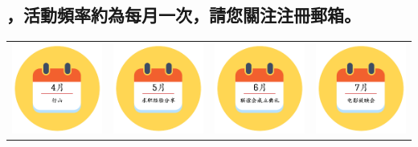 \documentclass[11pt, oneside,margin=1in]{article}   	%
\newcommand{\chuhao}{\fontsize{14bp}{\baselineskip}}
\begin{document}
\begin{CJK}{UTF8}{bkai}
\section*{，活動頻率約為每月一次，請您關注注冊郵箱。}
\center
\begin{tabular}{ l c r r }
 \includegraphics[width=1.2in]{res/4.png} &  \includegraphics[width=1.2in]{res/5.png}  &  \includegraphics[width=1.2in]{res/6.png}  &  \includegraphics[width=1.2in]{res/7.png} \\

\end{tabular}
\end{CJK}
\end{document}
